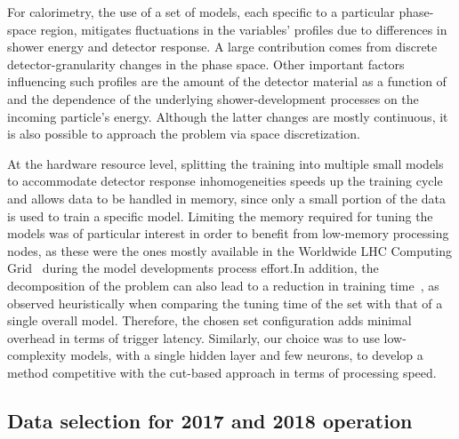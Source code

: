 For calorimetry, the use of a set of models, each specific to a particular phase-space region, mitigates fluctuations in the variables' profiles
due to differences in shower energy and detector response.
A large contribution comes from discrete detector-granularity changes in the phase space. Other important factors 
influencing such profiles are the
amount of the detector material as a function of \abseta{} and the dependence of the
underlying shower-development processes on the incoming
particle's energy. Although the latter changes are mostly continuous, it is also
possible to approach the problem via space discretization.

At the hardware resource level, splitting the training into multiple small models to accommodate detector response inhomogeneities speeds up the training cycle and allows data to be handled in memory, since only a small portion of the data is used to train a specific model. Limiting the memory required for tuning the models was of particular interest in order to benefit from low-memory processing nodes, as these were the ones mostly available in the Worldwide LHC Computing Grid~\cite{2015_lcg_tdr} during the model developments process effort.\@ In addition, the decomposition of the problem can also lead to a reduction in training time~\cite{Polikar2006}, as observed heuristically
when comparing the tuning time of the set with that of a single overall model. 
Therefore, the chosen set configuration adds
minimal overhead in terms of trigger latency. Similarly, our choice was to
use low-complexity models, with a single hidden layer and few neurons, to develop a method competitive with the cut-based approach in terms of processing speed.






\subsection{Data selection for 2017 and 2018 operation}

